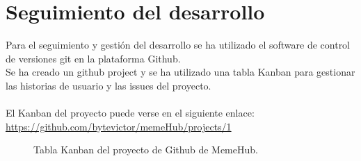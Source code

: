 

\section{Seguimiento del desarrollo}
Para el seguimiento y gestión del desarrollo se ha utilizado el software de control de versiones
git\cite{git} en la plataforma Github\cite{Github}.
\\
Se ha creado un github project y se ha utilizado una tabla Kanban para gestionar las historias 
de usuario y las issues del proyecto.
\\\\
El Kanban del proyecto puede verse en el siguiente enlace:
\url{https://github.com/bytevictor/memeHub/projects/1}

\begin{figure}[!h]
  \centering
  \noindent{}
  \caption{Tabla Kanban del proyecto de Github de MemeHub.}
\end{figure}
